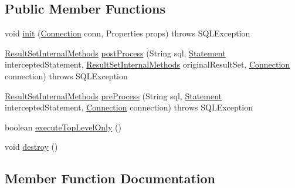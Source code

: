 \subsection*{Public Member Functions}
\begin{DoxyCompactItemize}
\item 
void \mbox{\hyperlink{classcom_1_1mysql_1_1jdbc_1_1interceptors_1_1_server_status_diff_interceptor_a3d503667dd4d8f6dcaf6fbf4535bd5bf}{init}} (\mbox{\hyperlink{interfacecom_1_1mysql_1_1jdbc_1_1_connection}{Connection}} conn, Properties props)  throws S\+Q\+L\+Exception 
\item 
\mbox{\hyperlink{interfacecom_1_1mysql_1_1jdbc_1_1_result_set_internal_methods}{Result\+Set\+Internal\+Methods}} \mbox{\hyperlink{classcom_1_1mysql_1_1jdbc_1_1interceptors_1_1_server_status_diff_interceptor_abe61d99e64bc15f2c21ffbfcfb90b1d7}{post\+Process}} (String sql, \mbox{\hyperlink{interfacecom_1_1mysql_1_1jdbc_1_1_statement}{Statement}} intercepted\+Statement, \mbox{\hyperlink{interfacecom_1_1mysql_1_1jdbc_1_1_result_set_internal_methods}{Result\+Set\+Internal\+Methods}} original\+Result\+Set, \mbox{\hyperlink{interfacecom_1_1mysql_1_1jdbc_1_1_connection}{Connection}} connection)  throws S\+Q\+L\+Exception 
\item 
\mbox{\hyperlink{interfacecom_1_1mysql_1_1jdbc_1_1_result_set_internal_methods}{Result\+Set\+Internal\+Methods}} \mbox{\hyperlink{classcom_1_1mysql_1_1jdbc_1_1interceptors_1_1_server_status_diff_interceptor_a718f346771c1ba970d94c099765d2138}{pre\+Process}} (String sql, \mbox{\hyperlink{interfacecom_1_1mysql_1_1jdbc_1_1_statement}{Statement}} intercepted\+Statement, \mbox{\hyperlink{interfacecom_1_1mysql_1_1jdbc_1_1_connection}{Connection}} connection)  throws S\+Q\+L\+Exception 
\item 
boolean \mbox{\hyperlink{classcom_1_1mysql_1_1jdbc_1_1interceptors_1_1_server_status_diff_interceptor_a3e6b3e52ee87900cec14f20f1b96cdfe}{execute\+Top\+Level\+Only}} ()
\item 
void \mbox{\hyperlink{classcom_1_1mysql_1_1jdbc_1_1interceptors_1_1_server_status_diff_interceptor_a54edef982686f41b6d328571956a5fca}{destroy}} ()
\end{DoxyCompactItemize}


\subsection{Member Function Documentation}
\mbox{\label{classcom_1_1mysql_1_1jdbc_1_1interceptors_1_1_server_status_diff_interceptor_a54edef982686f41b6d328571956a5fca}} 
